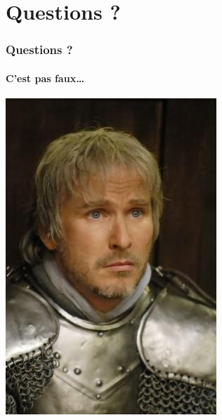 \documentclass[t,12pt]{beamer}
\begin{document}
\section{Questions ?}
\begin{frame}
  \frametitle{Questions ?}
  \framesubtitle{C'est pas faux…}

  \begin{center}
    \includegraphics[scale=0.6]{perseval.jpg}
  \end{center}
\end{frame}
\end{document}

